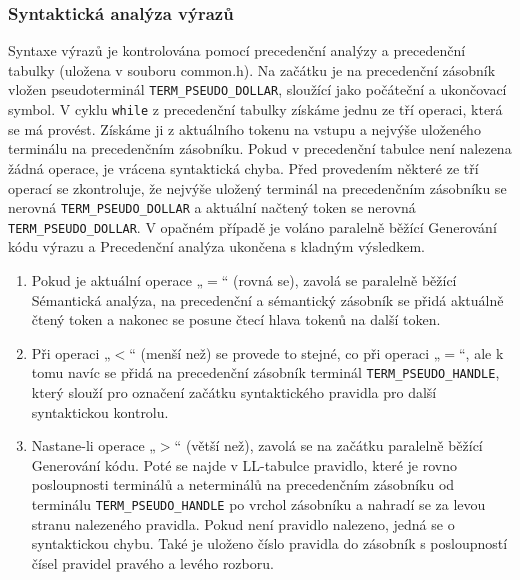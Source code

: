 \documentclass[a4paper, 12pt]{article}
\begin{document}
\subsubsection{Syntaktická analýza výrazů}
Syntaxe výrazů je kontrolována pomocí precedenční analýzy a precedenční tabulky (uložena v souboru common.h). Na začátku je na precedenční zásobník vložen pseudoterminál \linebreak \verb|TERM_PSEUDO_DOLLAR|, sloužící jako počáteční a ukončovací symbol. V cyklu \verb|while| z precedenční tabulky získáme jednu ze tří operaci, která se má provést. Získáme ji z aktuálního tokenu na vstupu a nejvýše uloženého terminálu na precedenčním zásobníku. Pokud v precedenční tabulce není nalezena žádná operace, je vrácena syntaktická chyba. Před provedením některé ze tří operací se zkontroluje, že nejvýše uložený terminál na precedenčním zásobníku se nerovná \verb|TERM_PSEUDO_DOLLAR| a aktuální načtený token se nerovná \verb|TERM_PSEUDO_DOLLAR|. V opačném případě je voláno paralelně běžící Generování kódu výrazu a Precedenční analýza ukončena s kladným výsledkem.
\begin{enumerate}
    \item Pokud je aktuální operace „$=$“ (rovná se), zavolá se paralelně běžící Sémantická analýza, na precedenční a sémantický zásobník se přidá aktuálně čtený token a nakonec se posune čtecí hlava tokenů na další token.
    \item Při operaci „$<$“ (menší než) se provede to stejné, co při operaci „$=$“, ale k tomu navíc se přidá na precedenční zásobník terminál \verb|TERM_PSEUDO_HANDLE|, který slouží pro označení začátku syntaktického pravidla pro další syntaktickou kontrolu.
    \item Nastane-li operace „$>$“ (větší než), zavolá se na začátku paralelně běžící Generování kódu.  Poté se najde v LL-tabulce pravidlo, které je rovno posloupnosti terminálů a neterminálů na precedenčním zásobníku od terminálu \verb|TERM_PSEUDO_HANDLE| po vrchol zásobníku a nahradí se za levou stranu nalezeného pravidla. Pokud není pravidlo nalezeno, jedná se o syntaktickou chybu. Také je uloženo číslo pravidla do zásobník s posloupností čísel pravidel pravého a levého rozboru.
\end{enumerate}

\newpage

\end{document}

